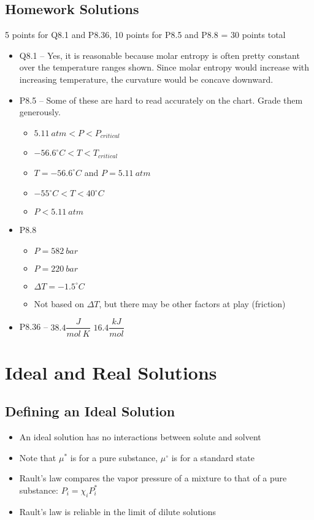 \documentclass[12pt, openany, letterpaper]{memoir}
\begin{document}
\section*{Homework Solutions}
5 points for Q8.1 and P8.36, 10 points for P8.5 and P8.8 = 30 points total
\begin{itemize}
	\item Q8.1 -- Yes, it is reasonable because molar entropy is often pretty constant over the temperature ranges shown. Since molar entropy would increase with increasing temperature, the curvature would be concave downward.
	\item P8.5 -- Some of these are hard to read accurately on the chart. Grade them generously.
	\begin{itemize}
		\item $5.11~atm<P<P_{critical}$		
		\item $-56.6^\circ C < T < T_{critical}$
		\item $T=-56.6^\circ C$ and $P=5.11~atm$
		\item $-55^\circ C < T < 40^\circ C$
		\item $P<5.11~atm$
	\end{itemize}
	\item P8.8
	\begin{itemize}
		\item $P=582~bar$
		\item $P = 220~bar$
		\item $\Delta T=-1.5^\circ C$
		\item Not based on $\Delta T$, but there may be other factors at play (friction)
	\end{itemize}
	\item P8.36 -- $38.4 \dfrac{J}{mol~K}$ $16.4\dfrac{kJ}{mol}$
\end{itemize}

\chapter{Ideal and Real Solutions}
\section*{Defining an Ideal Solution}
\begin{itemize}
	\item An ideal solution has no interactions between solute and solvent
	\item Note that $\mu^*$ is for a pure substance, $\mu^\circ$ is for a standard state
	\item Rault's law compares the vapor pressure of a mixture to that of a pure substance: $P_i=\chi_iP_i^*$
	\item Rault's law is reliable in the limit of dilute solutions
\end{itemize}
\end{document}
